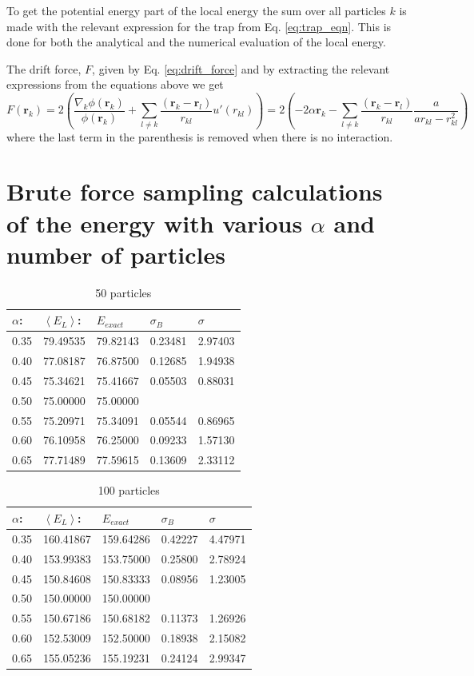 To get the potential energy part of the local energy the sum over all particles $k$ is made with the relevant expression for the trap from Eq. \ref{eq:trap_eqn}. This is done for both the analytical and the numerical evaluation of the local energy.

The drift force, $F$, given by Eq. \ref{eq:drift_force} and by extracting the relevant expressions from the equations above we get
$$ F(\mathbf{r}_k) = 2\left(\frac{\nabla_k\phi(\mathbf{r}_k)}{\phi(\mathbf{r}_k)}
   +\sum_{l\ne k}\frac{(\mathbf{r}_k-\mathbf{r}_l)}{r_{kl}}u'(r_{kl})\right) = 2 \left( -2\alpha  \mathbf{r}_k  - \sum_{l\ne k}\frac{(\mathbf{r}_k-\mathbf{r}_l)}{r_{kl}}\frac{a}{ar_{kl}-r_{kl}^2}\right) $$ 
where the last term in the parenthesis is removed when there is no interaction.

\section{Brute force sampling calculations of the energy with various $\alpha$ and number of particles}\label{app:alpha_lists_brute_force}

\begin{table}[H]\caption{50 particles}\label{tab:brute_force_N_50}
\center
\begin{tabular}{lllll}
$\alpha$: & $\left< E_L \right>$:& $E_{exact}$ & $\sigma_B$ & $\sigma$\\ \hline
0.35 & 79.49535 & 79.82143 & 0.23481 & 2.97403\\
0.40 & 77.08187 & 76.87500 & 0.12685 & 1.94938\\
0.45 & 75.34621 & 75.41667 & 0.05503 & 0.88031\\
0.50 & 75.00000 & 75.00000 &                &                \\ 
0.55 & 75.20971 & 75.34091 & 0.05544 & 0.86965\\
0.60 & 76.10958 & 76.25000 & 0.09233 & 1.57130\\
0.65 & 77.71489 & 77.59615 & 0.13609 & 2.33112\\
\end{tabular}
\end{table} 

\begin{table}[H]\caption{100 particles}\label{tab:brute_force_N_100}
\center
\begin{tabular}{lllll}
$\alpha$: & $\left< E_L \right>$:& $E_{exact}$ & $\sigma_B$ & $\sigma$\\ \hline
0.35 & 160.41867 & 159.64286 & 0.42227 & 4.47971\\
0.40 & 153.99383 & 153.75000 & 0.25800 & 2.78924\\
0.45 & 150.84608 & 150.83333 & 0.08956 & 1.23005\\
0.50 & 150.00000 & 150.00000 &                 &                \\ 
0.55 & 150.67186 & 150.68182 & 0.11373 & 1.26926\\
0.60 & 152.53009 & 152.50000 & 0.18938 & 2.15082\\
0.65 & 155.05236 & 155.19231 & 0.24124 & 2.99347\\
\end{tabular}
\end{table} 

